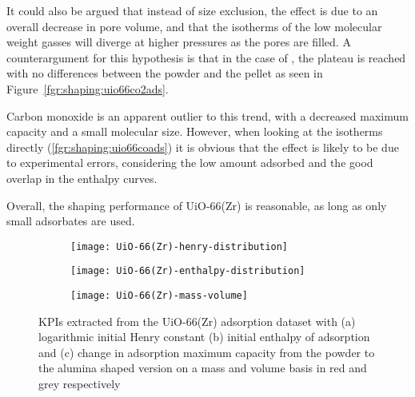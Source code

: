 It could also be argued that instead of size exclusion, the effect is due to
an overall decrease in pore volume, and that the isotherms of the 
low molecular weight gasses will diverge at higher pressures 
as the pores are filled. A counterargument for this hypothesis is that in the 
case of , the plateau is reached with no differences between the 
powder and the pellet as seen in Figure~\ref{fgr:shaping:uio66co2ads}.

Carbon monoxide is an apparent outlier to this trend, with a 
decreased maximum capacity and a small molecular size.
However, when looking at the isotherms directly 
(\ref{fgr:shaping:uio66coads}) it is obvious that the effect is
likely to be due to experimental errors, considering
the low amount adsorbed and the good overlap in the enthalpy
curves.

Overall, the shaping performance of UiO-66(Zr) is 
reasonable, as long as only small adsorbates are used.

\begin{figure}[p!]
    \centering
    \begin{subfigure}{0.8\textwidth}
        \parbox[c]{0.1\linewidth}{\caption{}%
        \label{fig:shaping:analysisuio66henry}}%
        \parbox[b]{0.7\linewidth}{%
        \texttt{[image: UiO-66(Zr)-henry-distribution]}%
        }%
    \end{subfigure}

    \begin{subfigure}{0.8\textwidth}
        \parbox[c]{0.1\linewidth}{\caption{}%
        \label{fig:shaping:analysisuio66enth}}%
        \parbox[b]{0.7\linewidth}{%
        \texttt{[image: UiO-66(Zr)-enthalpy-distribution]}%
        }%
    \end{subfigure}

    \begin{subfigure}{0.8\textwidth}
        \parbox[c]{0.1\linewidth}{\caption{}%
        \label{fig:shaping:analysisuio66basis}}%
        \parbox[b]{0.7\linewidth}{%
        \texttt{[image: UiO-66(Zr)-mass-volume]}%
        }%
    \end{subfigure}
    
    \caption{KPIs extracted from the UiO-66(Zr) adsorption dataset with
    (a) logarithmic initial Henry constant (b) initial enthalpy of 
    adsorption and (c) change in adsorption maximum capacity from the powder
    to the alumina shaped version on a mass and volume basis in red and grey
    respectively}%
    \label{fig:shaping:analysisuio66}
\end{figure}